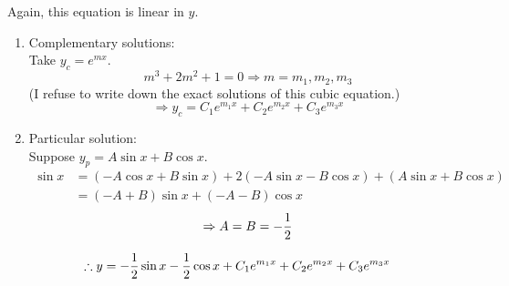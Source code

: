 \item

Again, this equation is linear in $y$.
\begin{enumerate}[wide, labelindent = 0pt, label = (\roman*)]
	\item Complementary solutions:\\
	      Take $y_c = e^{mx}$.
	      \[
		      m^3 + 2m^2 + 1 = 0
		      \Rightarrow m = m_1, m_2, m_3
	      \]
	      (I refuse to write down the exact solutions of this cubic equation.)
	      \[
		      \Rightarrow y_c = C_1 e^{m_1 x} + C_2 e^{m_2 x} + C_3 e^{m_3 x}
	      \]

	\item Particular solution:\\
	      Suppose $y_p = A\sin x + B\cos x$.
	      \begin{align*}
		      \sin x
		       & = (-A\cos x + B\sin x) + 2(-A\sin x - B\cos x) + (A\sin x + B\cos x) \\
		       & = (-A + B)\sin x + (-A - B)\cos x
	      \end{align*}
	      \[
		      \Rightarrow A = B = -\frac{1}{2}
	      \]
\end{enumerate}
\[
	\therefore y = -\frac{1}{2}\sin x -\frac{1}{2}\cos x + C_1 e^{m_1 x} + C_2 e^{m_2 x} + C_3 e^{m_3 x}
\]